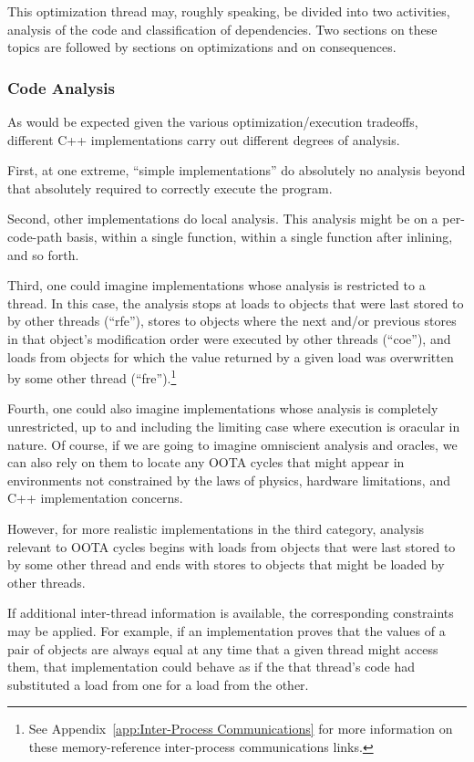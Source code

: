 \documentclass[10]{article}
\begin{document}
This optimization thread may, roughly speaking, be divided into two
activities, analysis of the code and classification of dependencies.
Two sections on these topics are followed by sections on optimizations
and on consequences.

\subsubsection{Code Analysis}
\label{sec:Code Analysis}

As would be expected given the various optimization/execution tradeoffs,
different C++ implementations carry out different degrees of analysis.

First, at one extreme, ``simple implementations'' do absolutely no
analysis beyond that absolutely required to correctly execute the program.

Second, other implementations do local analysis.
This analysis might be on a per-code-path basis, within a single function,
within a single function after inlining, and so forth.

Third, one could imagine implementations whose analysis is restricted to
a thread.
In this case, the analysis stops at loads to objects that were last
stored to by other threads (``rfe''), stores to objects where the next
and/or previous stores in that object's modification order were executed
by other threads (``coe''), and loads from objects for which the value
returned by a given load was overwritten by some other thread
(``fre'').\footnote{
	See Appendix~\ref{app:Inter-Process Communications} for more
	information on these memory-reference inter-process communications
	links.}

Fourth, one could also imagine implementations whose analysis is
completely unrestricted, up to and including the limiting case where
execution is oracular in nature.
Of course, if we are going to imagine omniscient analysis and oracles,
we can also rely on them to locate any OOTA cycles that might appear
in environments not constrained by the laws of physics, hardware
limitations, and C++ implementation concerns.

However, for more realistic implementations in the third category,
analysis relevant to OOTA cycles begins with loads from objects that were
last stored to by some other thread and ends with stores to objects that
might be loaded by other threads.

If additional inter-thread information is available, the corresponding
constraints may be applied.
For example, if an implementation proves that the values of a pair of
objects are always equal at any time that a given thread might access
them, that implementation could behave as if the that thread's code had
substituted a load from one for a load from the other.
\end{document}
